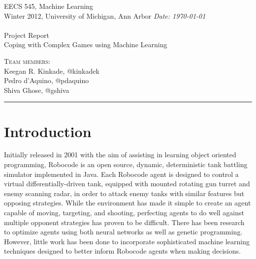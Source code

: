 \documentclass{article}
\newcommand{\shortbar}{\begin{center}\rule{5ex}{0.1pt}\end{center}}
\newcommand{\courseNumber}{EECS 545}
\newcommand{\courseTitle}{Machine Learning}
\newcommand{\semester}{Winter 2012}
\theoremstyle{plain}
\theoremstyle{definition}
\theoremstyle{remark}
\newenvironment{solution}[1]{\medskip\noindent{\bf Problem #1.~}}{\shortbar}
\newcommand{\solutions}[4]{
\vspace{-2ex}
\begin{center}
{\small  \courseNumber, \courseTitle
\hfill {\Large \bf {#1} }\\
\semester, University of Michigan, Ann Arbor \hfill
{\em Date: #3}}\\
\vspace{-1ex}
\hrulefill\\
\vspace{4ex}
{\normalsize Project Report}\\
{\LARGE  #2}\\
\vspace{2ex}
\end{center}
\begin{trivlist}
\item \textsc{Team members:} {#4}
\end{trivlist}
\noindent
\vspace{-1cm}
\shortbar
\vspace{-0.5cm}
}
\begin{document}
\solutions{}{Coping with Complex Games using Machine Learning}{\today}{\\ Keegan R. Kinkade, @kinkadek\\ Pedro d'Aquino, @pdaquino \\Shiva Ghose, @gshiva }
%
%

\begin{abstract}
Robocode\cite{robocode} is a battle-tank simulator in which agents battle against each other in a dynamic environment. Traditionally, most agents have been hand-coded. In this project, we create an agent that utilizes machine learning techniques to decide which actions to take. In particular, we use support vector machines to learn evasion and targeting strategies, achieving competitive results. We also implement Q-learning to learn targeting strategies, but with less success. We test our robot against available competitive Robocode agents and present our results.
\end{abstract}

\section{Introduction}

Initially released in 2001 with the aim of assisting in learning object oriented programming, Robocode is an open source, dynamic, deterministic tank battling simulator implemented in Java. Each Robocode agent is designed to control a virtual differentially-driven tank, equipped with mounted rotating gun turret and enemy scanning radar, in order to attack enemy tanks with similar features but opposing strategies. While the environment has made it simple to create an agent capable of moving, targeting, and shooting, perfecting agents to do well against multiple opponent strategies has proven to be difficult. There has been research to optimize agents using both neural networks as well as genetic programming. However, little work has been done to incorporate sophisticated machine learning techniques designed to better inform Robocode agents when making decisions. 
\end{document}
